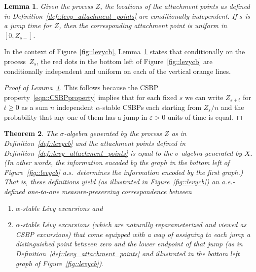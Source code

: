 \documentclass[JEP,XML,SOM,Unicode]{cedram}
\let\epsilon\varepsilon
\theoremstyle{plain}
\newtheorem{theorem}{Theorem}
\numberwithin{theorem}{section}
\newtheorem{lemma}[theorem]{Lemma}
\theoremstyle{definition}
\begin{document}
\begin{lemma}
\label{lem::bubble_locations_independent}
Given the process $Z$, the locations of the attachment points as defined in Definition~\ref{def::levy_attachment_points} are conditionally independent. If $s$ is a jump time for $Z$, then the corresponding attachment point is uniform in $[0,Z_{s-}]$.
\end{lemma}
In the context of Figure~\ref{fig::levycb}, Lemma~\ref{lem::bubble_locations_independent} states that conditionally on the process~$Z_s$, the red dots in the bottom left of Figure~\ref{fig::levycb} are conditionally independent and uniform on each of the vertical orange lines.
\begin{proof}[Proof of Lemma~\ref{lem::bubble_locations_independent}]
This follows because the CSBP property~\eqref{eqn::CSBPproperty} implies that for each fixed $s$ we can write $Z_{s+t}$ for $t \geq 0$ as a sum $n$ independent $\alpha$-stable CSBPs each starting from $Z_s/n$ and the probability that any one of them has a jump in $\epsilon > 0$ units of time is equal.
\end{proof}

\begin{theorem}
\label{thm::levynetrecover}
The $\sigma$-algebra generated by the process $Z$ as in Definition~\ref{def::levycb} and the attachment points defined in Definition~\ref{def::levy_attachment_points} is equal to the $\sigma$-algebra generated by $X$. (In other words, the information encoded by the graph in the bottom left of Figure~\ref{fig::levycb} a.s.\ determines the information encoded by the first graph.) That is, these definitions yield (as illustrated in Figure~\ref{fig::levycb}) an a.e.-defined one-to-one measure-preserving correspondence between
\begin{enumerate}
\item $\alpha$-stable Lévy excursions and
\item $\alpha$-stable Lévy excursions (which are naturally reparameterized and viewed as CSBP excursions) that come equipped with a way of assigning to each jump a distinguished point between zero and the lower endpoint of that jump (as in Definition~\ref{def::levy_attachment_points} and illustrated in the bottom left graph of Figure~\ref{fig::levycb}).
\end{enumerate}
\end{theorem}
\end{document}

